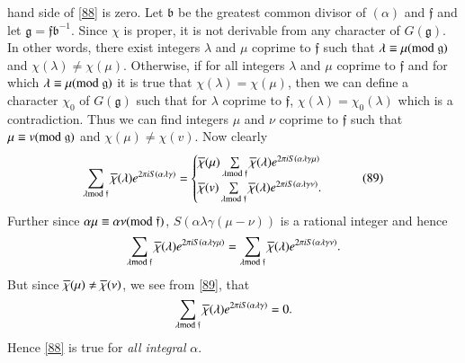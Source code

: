 hand side of \eqref{88} is zero. Let $\mathfrak{b}$ be the greatest
common divisor of $(\alpha)$ and $\mathfrak{f}$ and let
$\mathfrak{g}=\mathfrak{f}\mathfrak{b}^{-1}$. Since $\chi$ is proper,
it is not derivable from any character of $G(\mathfrak{g})$. In other
words, there exist integers $\lambda$ and $\mu$ coprime to
$\mathfrak{f}$ such that $\lambda\equiv \mu(\rm{mod} \; \mathfrak{g})$ and
$\chi(\lambda)\neq \chi(\mu)$. Otherwise, if for all integers
$\lambda$ and $\mu$ coprime to $\mathfrak{f}$ and for which
$\lambda\equiv \mu(\rm{mod} \;\mathfrak{g})$ it is true that
$\chi(\lambda)=\chi(\mu)$, then we can define a character $\chi_{0}$
of $G(\mathfrak{g})$ such that for $\lambda$ coprime to
$\mathfrak{f}$, $\chi(\lambda)=\chi_{0}(\lambda)$ which is a
contradiction. Thus we can find integers $\mu$ and $\nu$ coprime to
$\mathfrak{f}$ such that $\mu\equiv v(\rm{mod} \;\mathfrak{g})$ and
$\chi(\mu)\neq \chi(v)$. Now clearly
\begin{equation*}
\sum_{\lambda\rm{mod} \;\mathfrak{f}}\overline{\chi}(\lambda)e^{2\pi
  iS(\alpha\lambda\gamma)}=
\begin{cases}
\overline{\chi}(\mu)\sum\limits_{\lambda\rm{mod} \;\mathfrak{f}}\overline{\chi}(\lambda)e^{2\pi
  iS(\alpha\lambda\gamma\mu)}\\
\overline{\chi}(v)\sum\limits_{\lambda\rm{mod} \;\mathfrak{f}}\overline{\chi}(\lambda)e^{2\pi
  iS(\alpha\lambda\gamma \nu)}.
\end{cases}\tag{89}\label{89}
\end{equation*}
Further since $\alpha\mu\equiv \alpha\nu(\rm{mod} \;\mathfrak{f})$,
$S(\alpha\lambda\gamma(\mu-\nu))$ is a rational integer and hence
$$
\sum_{\lambda\rm{mod} \;\mathfrak{f}}\overline{\chi}(\lambda)e^{2\pi
  iS(\alpha\lambda\gamma\mu)}=\sum_{\lambda\rm{mod} \;\mathfrak{f}}\overline{\chi}(\lambda)e^{2\pi
  iS(\alpha\lambda\gamma\nu)}. 
$$
But since $\overline{\chi}(\mu)\neq \overline{\chi}(\nu)$, we see from \eqref{89},
that
$$
\sum_{\lambda\rm{mod} \;\mathfrak{f}}\overline{\chi}(\lambda)e^{2\pi
  iS(\alpha\lambda\gamma)}=0.
$$
Hence \eqref{88} is true for {\em all integral} $\alpha$.

